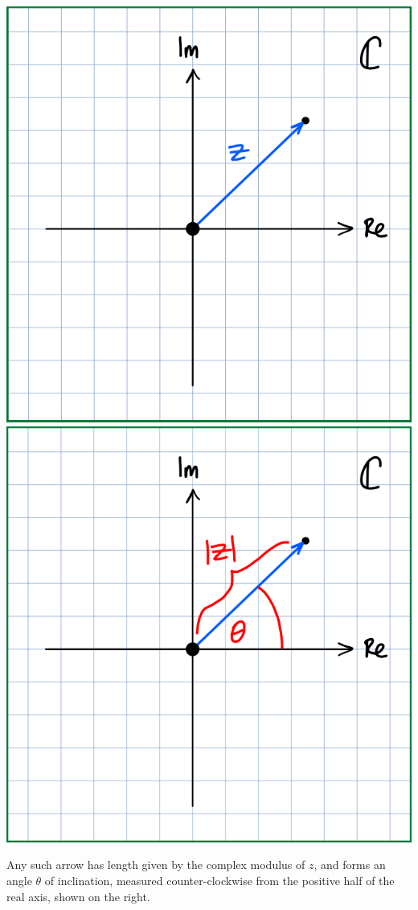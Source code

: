 \documentclass[11pt,fleqn,dvipsnames,usenames]{article}
\newcommand{\p}{\noindent}
\begin{document}
\begin{center}
\includegraphics[width=0.3\linewidth]{geometriccomplex}\hspace{4cm} \includegraphics[width=0.3\linewidth]{geometriccomplexlabelled}
\end{center}

\p Any such arrow has length given by the complex modulus of $z$, and forms an angle $\theta$ of inclination, measured counter-clockwise from the positive half of the real axis, shown on the right.
\end{document}
